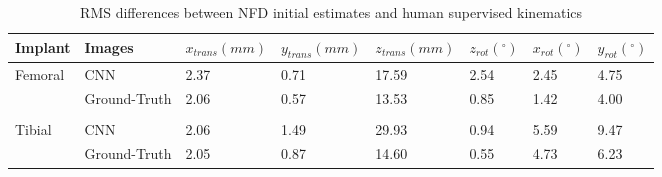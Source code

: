 {\begin{landscape}
	\begin{table}[h!]
		\centering
		\caption{RMS differences between NFD initial estimates and human supervised kinematics}
		\label{tab:nfd-rms}
		\begin{tabularx}{1.0\linewidth}[h!]{XXXXXXXX}
			\hline
			Implant                  & Images       & $x_{trans} (mm)$ & $y_{trans} (mm)$ & $z_{trans} (mm)$ & $z_{rot} (^{\circ})$ & $x_{rot} (^{\circ})$ & $y_{rot} (^{\circ})$ \\ \hline
			\multirow{2}{*}{Femoral} & CNN          & 2.37             & 0.71             & 17.59            & 2.54                 & 2.45                 & 4.75                 \\
			                         & Ground-Truth & 2.06             & 0.57             & 13.53            & 0.85                 & 1.42                 & 4.00                 \\ \\
			\multirow{2}{*}{Tibial}  & CNN          & 2.06             & 1.49             & 29.93            & 0.94                 & 5.59                 & 9.47                 \\
			                         & Ground-Truth & 2.05             & 0.87             & 14.60            & 0.55                 & 4.73                 & 6.23                 \\ \hline
		\end{tabularx}
	\end{table}



\end{landscape}}
